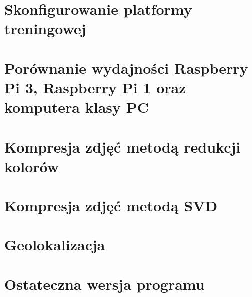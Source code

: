 \documentclass[12pt, a4paper]{report}
\begin{document}
    \chapter{Skonfigurowanie platformy treningowej}\label{ch:cover}
    

    \chapter{Porównanie wydajności Raspberry Pi 3, Raspberry Pi 1 oraz komputera klasy PC}\label{ch:performance}
    

    \chapter{Kompresja zdjęć metodą redukcji kolorów}
    

    \chapter{Kompresja zdjęć metodą SVD}\label{ch:compression}
    

    \chapter{Geolokalizacja}\label{ch:geolocalisation}
    

    \chapter{Ostateczna wersja programu}\label{ch:final}
    
\end{document}
